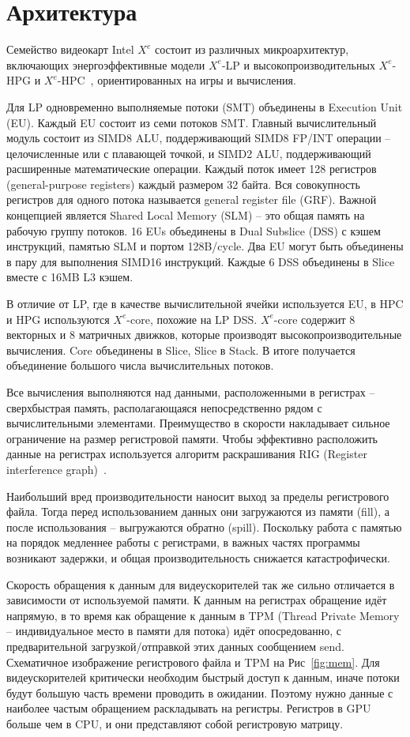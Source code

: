 \section{Архитектура}
\label{sec:Arch}

Семейство видеокарт Intel $X^e$ состоит из различных микроархитектур, включающих энергоэффективные модели $X^e$-LP и высокопроизводительных $X^e$-HPG и $X^e$-HPC~\cite{intelArch}, ориентированных на игры и вычисления.

Для LP одновременно выполняемые потоки (SMT) объединены в Execution Unit (EU).
Каждый EU состоит из семи потоков SMT. Главный вычислительный модуль состоит из SIMD8 ALU, поддерживающий SIMD8 FP/INT операции -- целочисленные или с плавающей точкой, и SIMD2 ALU, поддерживающий расширенные математические операции.
Каждый поток имеет 128 регистров (general-purpose registers) каждый размером 32 байта.
Вся совокупность регистров для одного потока называется general register file (GRF).
Важной концепцией является Shared Local Memory (SLM) -- это общая память на рабочую группу потоков.
16 EUs объединены в Dual Subslice (DSS) с кэшем инструкций, памятью SLM и портом 128B/cycle.
Два EU могут быть объединены в пару для выполнения SIMD16 инструкций. Каждые 6 DSS объединены в Slice вместе с 16MB L3 кэшем.

В отличие от LP, где в качестве вычислительной ячейки используется EU, в HPC и HPG используются $X^e$-core, похожие на LP DSS.
$X^e$-core содержит 8 векторных и 8 матричных движков, которые производят высокопроизводительные вычисления.
Core объединены в Slice, Slice в Stack.
В итоге получается объединение большого числа вычислительных потоков.

Все вычисления выполняются над данными, расположенными в регистрах -- сверхбыстрая память, располагающаяся непосредственно рядом с вычислительными элементами.
Преимущество в скорости накладывает сильное ограничение на размер регистровой памяти.
Чтобы эффективно расположить данные на регистрах используется алгоритм раскрашивания RIG (Register interference graph)~\cite{regalloc}.

Наибольший вред производительности наносит выход за пределы регистрового файла.
Тогда перед использованием данных они загружаются из памяти (fill), а после использования -- выгружаются обратно (spill).
Поскольку работа с памятью на порядок медленнее работы с регистрами, в важных частях программы возникают задержки, и общая производительность снижается катастрофически.

Скорость обращения к данным для видеускорителей так же сильно отличается в зависимости от используемой памяти.
К данным на регистрах обращение идёт напрямую, в то время как обращение к данным в TPM (Thread Private Memory -- индивидуальное место в памяти для потока) идёт опосредованно, с предварительной загрузкой/отправкой этих данных сообщением send.
Схематичное изображение регистрового файла и TPM на Рис~\ref{fig:mem}.
Для видеускорителей критически необходим быстрый доступ к данным, иначе потоки будут большую часть времени проводить в ожидании.
Поэтому нужно данные с наиболее частым обращением раскладывать на регистры. Регистров в GPU больше чем в CPU, и они представляют собой регистровую матрицу.

